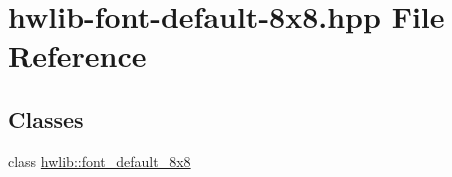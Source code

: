 \hypertarget{hwlib-font-default-8x8_8hpp}{}\section{hwlib-\/font-\/default-\/8x8.hpp File Reference}
\label{hwlib-font-default-8x8_8hpp}
\subsection*{Classes}
\begin{DoxyCompactItemize}
\item 
class \hyperlink{classhwlib_1_1font__default__8x8}{hwlib\+::font\+\_\+default\+\_\+8x8}
\end{DoxyCompactItemize}
